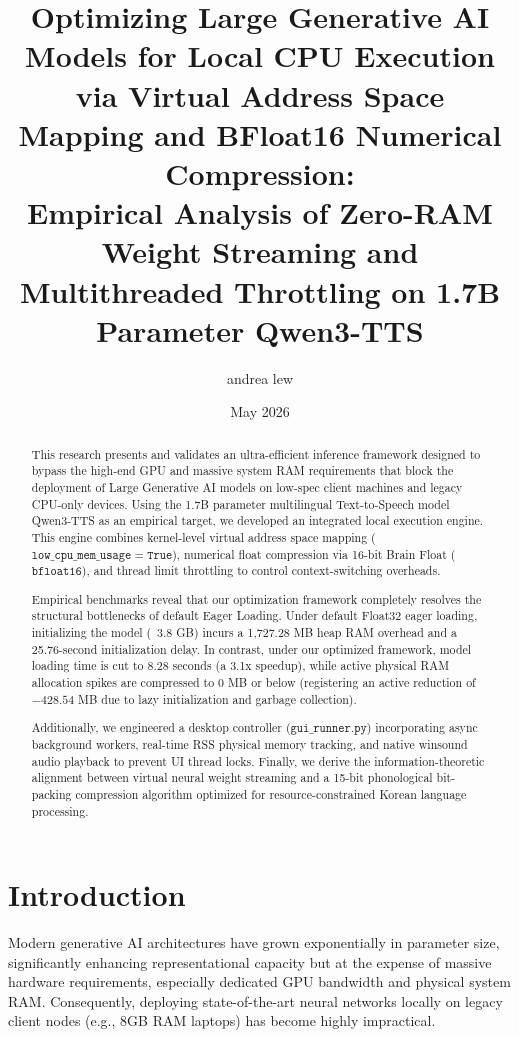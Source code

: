 \documentclass[twocolumn]{article}
\title{Optimizing Large Generative AI Models for Local CPU Execution via Virtual Address Space Mapping and BFloat16 Numerical Compression:\\\large Empirical Analysis of Zero-RAM Weight Streaming and Multithreaded Throttling on 1.7B Parameter Qwen3-TTS}
\author{andrea lew}
\date{May 2026}
\begin{document}
\maketitle

\begin{abstract}
This research presents and validates an ultra-efficient inference framework designed to bypass the high-end GPU and massive system RAM requirements that block the deployment of Large Generative AI models on low-spec client machines and legacy CPU-only devices. Using the 1.7B parameter multilingual Text-to-Speech model Qwen3-TTS as an empirical target, we developed an integrated local execution engine. This engine combines kernel-level virtual address space mapping ($\mathtt{low\_cpu\_mem\_usage=True}$), numerical float compression via 16-bit Brain Float ($\mathtt{bfloat16}$), and thread limit throttling to control context-switching overheads.

Empirical benchmarks reveal that our optimization framework completely resolves the structural bottlenecks of default Eager Loading. Under default Float32 eager loading, initializing the model (~3.8 GB) incurs a 1,727.28 MB heap RAM overhead and a 25.76-second initialization delay. In contrast, under our optimized framework, model loading time is cut to 8.28 seconds (a 3.1x speedup), while active physical RAM allocation spikes are compressed to 0 MB or below (registering an active reduction of $-428.54$ MB due to lazy initialization and garbage collection).

Additionally, we engineered a desktop controller ($\mathtt{gui\_runner.py}$) incorporating async background workers, real-time RSS physical memory tracking, and native winsound audio playback to prevent UI thread locks. Finally, we derive the information-theoretic alignment between virtual neural weight streaming and a 15-bit phonological bit-packing compression algorithm optimized for resource-constrained Korean language processing.
\end{abstract}

\section{Introduction}
Modern generative AI architectures have grown exponentially in parameter size, significantly enhancing representational capacity but at the expense of massive hardware requirements, especially dedicated GPU bandwidth and physical system RAM. Consequently, deploying state-of-the-art neural networks locally on legacy client nodes (e.g., 8GB RAM laptops) has become highly impractical.
\end{document}
